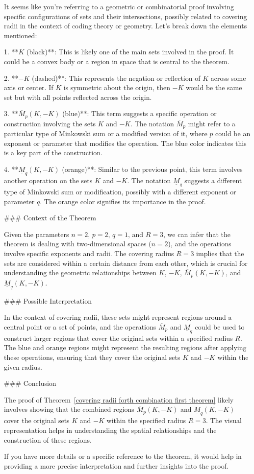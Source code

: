 It seems like you're referring to a geometric or combinatorial proof involving specific configurations of sets and their intersections, possibly related to covering radii in the context of coding theory or geometry. Let's break down the elements mentioned:

1. **\( K \) (black)**: This is likely one of the main sets involved in the proof. It could be a convex body or a region in space that is central to the theorem.

2. **\(-K\) (dashed)**: This represents the negation or reflection of \( K \) across some axis or center. If \( K \) is symmetric about the origin, then \(-K\) would be the same set but with all points reflected across the origin.

3. **\(\overline{M}_p(K, -K)\) (blue)**: This term suggests a specific operation or construction involving the sets \( K \) and \(-K\). The notation \(\overline{M}_p\) might refer to a particular type of Minkowski sum or a modified version of it, where \( p \) could be an exponent or parameter that modifies the operation. The blue color indicates this is a key part of the construction.

4. **\(\underline{M}_q(K, -K)\) (orange)**: Similar to the previous point, this term involves another operation on the sets \( K \) and \(-K\). The notation \(\underline{M}_q\) suggests a different type of Minkowski sum or modification, possibly with a different exponent or parameter \( q \). The orange color signifies its importance in the proof.

### Context of the Theorem

Given the parameters \( n = 2 \), \( p = 2 \), \( q = 1 \), and \( R = 3 \), we can infer that the theorem is dealing with two-dimensional spaces (\( n = 2 \)), and the operations involve specific exponents and radii. The covering radius \( R = 3 \) implies that the sets are considered within a certain distance from each other, which is crucial for understanding the geometric relationships between \( K \), \(-K\), \(\overline{M}_p(K, -K)\), and \(\underline{M}_q(K, -K)\).

### Possible Interpretation

In the context of covering radii, these sets might represent regions around a central point or a set of points, and the operations \(\overline{M}_p\) and \(\underline{M}_q\) could be used to construct larger regions that cover the original sets within a specified radius \( R \). The blue and orange regions might represent the resulting regions after applying these operations, ensuring that they cover the original sets \( K \) and \(-K\) within the given radius.

### Conclusion

The proof of Theorem~\ref{covering radii forth combination first theorem} likely involves showing that the combined regions \(\overline{M}_p(K, -K)\) and \(\underline{M}_q(K, -K)\) cover the original sets \( K \) and \(-K\) within the specified radius \( R = 3 \). The visual representation helps in understanding the spatial relationships and the construction of these regions.

If you have more details or a specific reference to the theorem, it would help in providing a more precise interpretation and further insights into the proof.